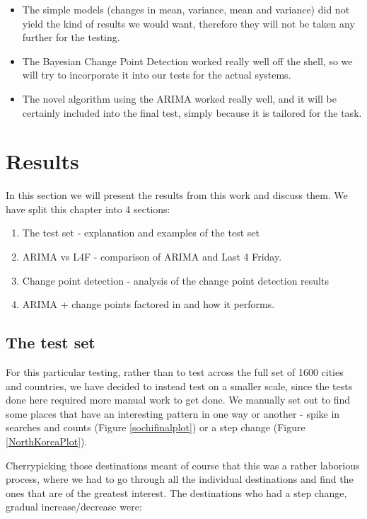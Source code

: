 \documentclass[minf,twoside,singlespacing,parskip,notimes,deptreport]{infthesis} %
\begin{document}
\begin{itemize}
\item The simple models (changes in mean, variance, mean and variance) did not yield the kind of results we would want, therefore they will not be taken any further for the testing. 
\item The Bayesian Change Point Detection worked really well off the shell, so we will try to incorporate it into our tests for the actual systems. 
\item The novel algorithm using the ARIMA worked really well, and it will be certainly included into the final test, simply because it is tailored for the task. 
\end{itemize}


\chapter{Results}

In this section we will present the results from this work and discuss them. We have split this chapter into 4 sections:
\begin{enumerate}
\item The test set - explanation and examples of the test set
\item ARIMA vs L4F - comparison of ARIMA and Last 4 Friday. 
\item Change point detection - analysis of the change point detection results
\item ARIMA + change points factored in and how it performs.
\end{enumerate}

\section{The test set}

For this particular testing, rather than to test across the full set of 1600 cities and countries, we have decided to instead test on a smaller scale, since the tests done here required more manual work to get done. We manually set out to find some places that have an interesting pattern in one way or another - spike in searches and counts (Figure \ref{sochifinalplot}) or a step change (Figure \ref{NorthKoreaPlot}).


Cherrypicking those destinations meant of course that this was a rather laborious process, where we had to go through all the individual destinations and find the ones that are of the greatest interest. 
The destinations who had a step change, gradual increase/decrease were:
\end{document}
